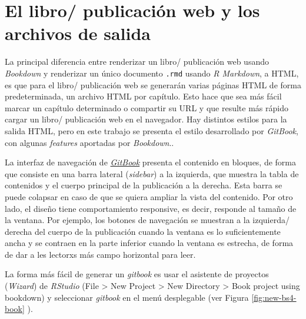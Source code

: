 \documentclass[
]{book}
\begin{document}
\hypertarget{el-libro-publicaciuxf3n-web-y-los-archivos-de-salida}{%
\section{El libro/ publicación web y los archivos de salida}\label{el-libro-publicaciuxf3n-web-y-los-archivos-de-salida}}

La principal diferencia entre renderizar un libro/ publicación web usando \emph{Bookdown} y renderizar un único documento \texttt{.rmd} usando \emph{R Markdown}, a HTML, es que para el libro/ publicación web se generarán varias páginas HTML de forma predeterminada, un archivo HTML por capítulo. Esto hace que sea más fácil marcar un capítulo determinado o compartir su URL y que resulte más rápido cargar un libro/ publicación web en el navegador. Hay distintos estilos para la salida HTML, pero en este trabajo se presenta el estilo desarrollado por \emph{GitBook}, con algunas \emph{features} aportadas por \emph{Bookdown}..

La interfaz de navegación \citep{manovichLenguajeNuevosMedios2006} de \href{https://www.gitbook.com}{\emph{GitBook}} presenta el contenido en bloques, de forma que consiste en una barra lateral (\emph{sidebar}) a la izquierda, que muestra la tabla de contenidos y el cuerpo principal de la publicación a la derecha. Esta barra se puede colapsar en caso de que se quiera ampliar la vista del contenido. Por otro lado, el diseño tiene comportamiento responsive, es decir, responde al tamaño de la ventana. Por ejemplo, los botones de navegación se muestran a la izquierda/ derecha del cuerpo de la publicación cuando la ventana es lo suficientemente ancha y se contraen en la parte inferior cuando la ventana es estrecha, de forma de dar a les lectorxs más campo horizontal para leer.

La forma más fácil de generar un \emph{gitbook} es usar el asistente de proyectos (\emph{Wizard}) de \emph{RStudio} (File \textgreater{} New Project \textgreater{} New Directory \textgreater{} Book project using bookdown) y seleccionar \emph{gitbook} en el menú desplegable (ver Figura \ref{fig:new-bs4-book} ).
\end{document}
